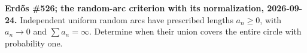 \textbf{Erd\H{o}s \#526; the random-arc criterion with its normalization, 2026-09-24.}
Independent uniform random arcs have prescribed lengths $a_n\geq0$, with $a_n\to0$ and $\sum a_n=\infty$. Determine when their union covers the entire circle with probability one.
